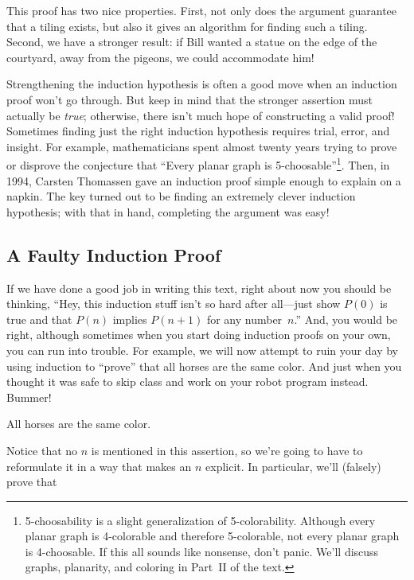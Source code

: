 This proof has two nice properties.  First, not only does the argument
guarantee that a tiling exists, but also it gives an algorithm for
finding such a tiling.  Second, we have a stronger result: if Bill
wanted a statue on the edge of the courtyard, away from the pigeons,
we could accommodate him!

Strengthening the induction hypothesis is often a good move when an
induction proof won't go through.  But keep in mind that the stronger
assertion must actually be \emph{true}; otherwise, there isn't much hope
of constructing a valid proof!  Sometimes finding just the right induction
hypothesis requires trial, error, and insight.  For example,
mathematicians spent almost twenty years trying to prove or disprove the
conjecture that ``Every planar graph is
5-choosable''\footnote{5-choosability is a slight generalization of
  5-colorability.  Although every planar graph is 4-colorable and
  therefore 5-colorable, not every planar graph is 4-choosable.  If this
  all sounds like nonsense, don't panic.  We'll discuss graphs, planarity,
  and coloring in Part~II of the text.}.  Then, in 1994, Carsten Thomassen
gave an induction proof simple enough to explain on a napkin.  The key
turned out to be finding an extremely clever induction hypothesis; with
that in hand, completing the argument was easy!


\subsection{A Faulty Induction Proof}

If we have done a good job in writing this text, right about now you
should be thinking, ``Hey, this induction stuff isn't so hard after
all---just show $P(0)$ is true and that $P(n)$ implies $P(n+1)$ for
any number~$n$.''  And, you would be right, although sometimes when
you start doing induction proofs on your own, you can run into
trouble.  For example, we will now attempt to ruin your day by using
induction to ``prove'' that all horses are the same color.  And just
when you thought it was safe to skip class and work on your robot
program instead.  Bummer!

\begin{falsethm*}
All horses are the same color.
\end{falsethm*}

Notice that no $n$ is mentioned in this assertion, so we're going to have
to reformulate it in a way that makes an $n$ explicit.  In particular,
we'll (falsely) prove that

